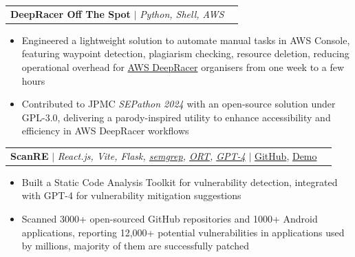 \documentclass[letterpaper,10pt]{article}
\makeatletter
\newcommand{\resumeItem}[1]{
  \item\small{
    {#1 \vspace{-1pt}}
  }
}
\newcommand{\resumeProjectHeading}[2]{
    \item
    \begin{tabular*}{0.97\textwidth}{l@{\extracolsep{\fill}}r}
      #1 & \small\textit{#2} \\
    \end{tabular*}\vspace{-6pt}
}
\newcommand{\resumeItemListStart}{\begin{itemize}}
\newcommand{\resumeItemListEnd}{\end{itemize}\vspace{-5pt}}
\makeatother
\begin{document}
      \resumeProjectHeading {
            \textbf{DeepRacer Off The Spot} 
            $|$ 
            \small
            {
                \emph{Python, Shell, AWS}
            }
        }
        {}
        \resumeItemListStart
            \resumeItem {
                  Engineered a lightweight solution to automate manual tasks in AWS Console, featuring waypoint detection, plagiarism checking, resource deletion, reducing operational overhead for \href{https://aws.amazon.com/deepracer}{AWS DeepRacer} organisers from one week to a few hours
            }
            \resumeItem {
                 Contributed to JPMC \textit{SEPathon 2024} with an open-source solution under GPL-3.0, delivering a parody-inspired utility to enhance accessibility and efficiency in AWS DeepRacer workflows
            }
        \resumeItemListEnd
      \resumeProjectHeading {
            \textbf{ScanRE} 
            $|$ 
            \small
            {
                \emph{React.js, Vite, Flask, \href{https://github.com/semgrep/semgrep}{semgrep}, \href{https://github.com/oss-review-toolkit/ort}{ORT}, \href{https://platform.openai.com/docs/models/gpt-4}{GPT-4}}
            }
            $|$ 
            \href{https://github.com/ScanRE/ScanRE}{GitHub}, \href{https://youtu.be/C9mS0H-aYro}{Demo}
        }
        {}
        \resumeItemListStart
            \resumeItem {
                Built a Static Code Analysis Toolkit for vulnerability detection, integrated with GPT-4 for vulnerability mitigation suggestions
            }
            \resumeItem {
                Scanned 3000+ open-sourced GitHub repositories and 1000+ Android applications, reporting 12,000+ potential vulnerabilities in applications used by millions, majority of them are successfully patched
            }
        \resumeItemListEnd

\end{document}
